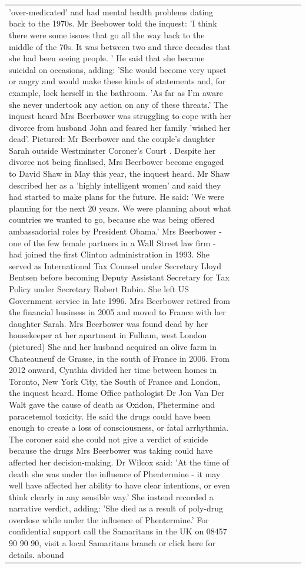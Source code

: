 \begin{table}[H]
\begin{tabular}{lllrlllll}
'over-medicated' and had mental health problems dating back to the 1970s. Mr Beebower told the inquest: 'I think there were some issues that go all the way back to the middle of the 70s. It was between two and three decades that she had been seeing people. ' He said that she became suicidal on occasions, adding: 'She would become very upset or angry and would make these kinds of statements and, for example, lock herself in the bathroom. 'As far as I'm aware she never undertook any action on any of these threats.' The inquest heard Mrs Beerbower was struggling to cope with her divorce from husband John and feared her family 'wished her dead'. Pictured: Mr Beerbower and the couple's daughter Sarah outside Westminster Coroner's Court . Despite her divorce not being finalised, Mrs Beerbower become engaged to David Shaw in May this year, the inquest heard. Mr Shaw described her as a 'highly intelligent women' and said they had started to make plans for the future. He said: 'We were planning for the next 20 years. We were planning about what countries we wanted to go, because she was being offered ambassadorial roles by President Obama.' Mrs Beerbower - one of the few female partners in a Wall Street law firm - had joined the first Clinton administration in 1993. She served as International Tax Counsel under Secretary Lloyd Bentsen before becoming Deputy Assistant Secretary for Tax Policy under Secretary Robert Rubin. She left US Government service in late 1996. Mrs Beerbower retired from the financial business in 2005 and moved to France with her daughter Sarah. Mrs Beerbower was found dead by her housekeeper at her apartment in Fulham, west London (pictured) She and her husband acquired an olive farm in Chateauneuf de Grasse, in the south of France in 2006. From 2012 onward, Cynthia divided her time between homes in Toronto, New York City, the South of France and London, the inquest heard. Home Office pathologist Dr Jon Van Der Walt gave the cause of death as Oxidon, Phetermine and paracetemol toxicity. He said the drugs could have been enough to create a loss of consciousness, or fatal arrhythmia. The coroner said she could not give a verdict of suicide because the drugs Mrs Beerbower was taking could have affected her decision-making. Dr Wilcox said: 'At the time of death she was under the influence of Phentermine - it may well have affected her ability to have clear intentions, or even think clearly in any sensible way.' She instead recorded a narrative verdict, adding: 'She died as a result of poly-drug overdose while under the influence of Phentermine.' For confidential support call the Samaritans in the UK on 08457 90 90 90, visit a local Samaritans branch or click here for details. abound \\

\end{tabular}
\end{table}
